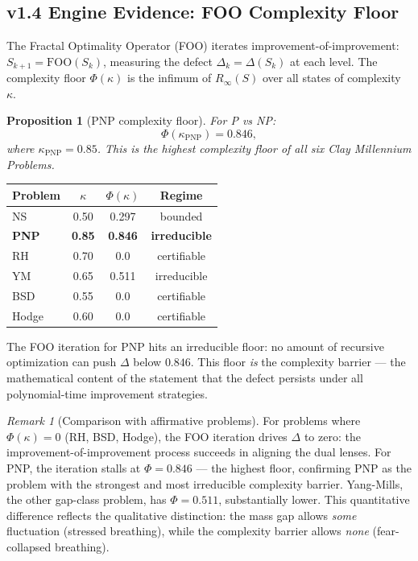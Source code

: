 \documentclass[11pt]{article}
\newtheorem{proposition}[theorem]{Proposition}
\theoremstyle{definition}
\theoremstyle{remark}
\newtheorem{remark}[theorem]{Remark}
\begin{document}
\subsection{v1.4 Engine Evidence: FOO Complexity Floor}
\label{sec:foo-pnp}

The Fractal Optimality Operator (FOO) iterates improvement-of-improvement:
$S_{k+1} = \mathrm{FOO}(S_k)$, measuring the defect $\Delta_k = \Delta(S_k)$
at each level.  The complexity floor $\Phi(\kappa)$ is the infimum of
$R_\infty(S)$ over all states of complexity~$\kappa$.

\begin{proposition}[PNP complexity floor]
\label{prop:foo-pnp}
For P vs NP:
\[
  \Phi(\kappa_{\mathrm{PNP}}) = 0.846,
\]
where $\kappa_{\mathrm{PNP}} = 0.85$.  This is the \emph{highest complexity
floor} of all six Clay Millennium Problems.
\end{proposition}

\begin{center}
\begin{tabular}{@{}lccc@{}}
\toprule
\textbf{Problem} & $\kappa$ & $\Phi(\kappa)$ & \textbf{Regime} \\
\midrule
NS & 0.50 & 0.297 & bounded \\
\textbf{PNP} & \textbf{0.85} & \textbf{0.846} & \textbf{irreducible} \\
RH & 0.70 & 0.0 & certifiable \\
YM & 0.65 & 0.511 & irreducible \\
BSD & 0.55 & 0.0 & certifiable \\
Hodge & 0.60 & 0.0 & certifiable \\
\bottomrule
\end{tabular}
\end{center}

\noindent
The FOO iteration for PNP hits an irreducible floor: no amount of recursive
optimization can push $\Delta$ below $0.846$.  This floor \emph{is} the
complexity barrier --- the mathematical content of the statement that the
defect persists under all polynomial-time improvement strategies.

\begin{remark}[Comparison with affirmative problems]
For problems where $\Phi(\kappa) = 0$ (RH, BSD, Hodge), the FOO iteration
drives $\Delta$ to zero: the improvement-of-improvement process succeeds in
aligning the dual lenses.  For PNP, the iteration stalls at $\Phi = 0.846$ ---
the highest floor, confirming PNP as the problem with the strongest and most
irreducible complexity barrier.  Yang-Mills, the other gap-class problem, has
$\Phi = 0.511$, substantially lower.  This quantitative difference reflects
the qualitative distinction: the mass gap allows \emph{some} fluctuation
(stressed breathing), while the complexity barrier allows \emph{none}
(fear-collapsed breathing).
\end{remark}
\end{document}
